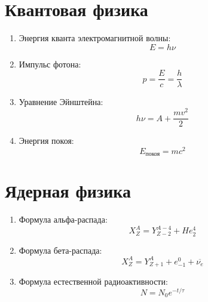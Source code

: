 	\section{Квантовая физика}
	\begin{enumerate}
		\item Энергия кванта электромагнитной волны: \[ E = h \nu \]
		\item Импульс фотона: \[ p = \frac{E}{c} = \frac{h}{\lambda} \]
		\item Уравнение Эйнштейна: \[ h \nu = A + \frac{mv^2}{2} \]
		\item Энергия покоя: \[ E_{\text{покоя}} = mc^2 \]
	\end{enumerate}
	
	\section{Ядерная физика}
	\begin{enumerate}
		\item Формула альфа-распада: \[ X^A_Z = Y_{Z-2}^{A-4} + He_{2}^4 \]
		\item Формула бета-распада: \[ X^A_Z = Y_{Z+1}^A + e_{-1}^0 + \overline{\nu_e} \]
		\item Формула естественной радиоактивности: \[ N = N_0 e^{-t / \tau} \]
	\end{enumerate}
	
